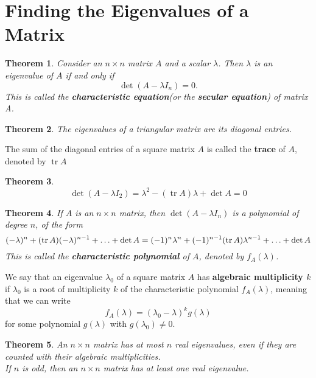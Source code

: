 \documentclass[letter]{article}
\newcommand{\tr}{\operatorname{tr}}
\newtheorem{theorem}{Theorem}[section]
\newenvironment{definition}[1][Definition]{\begin{trivlist}
\item[\hskip \labelsep {\bfseries #1}]}{\end{trivlist}}
\begin{document}
\section{Finding the Eigenvalues of a Matrix}
\begin{theorem}
Consider an $n \times n$ matrix $A$ and a scalar $\lambda$. Then $\lambda$ is an eigenvalue of $A$ if and only if
\[
\det(A-\lambda I_n) = 0.
\]
This is called the \textbf{characteristic equation}(or the \textbf{secular equation}) of matrix A.
\end{theorem}

\begin{theorem}
The eigenvalues of a triangular matrix are its diagonal entries.
\end{theorem}

\begin{definition}
The sum of the diagonal entries of a square matrix $A$ is called the \textbf{trace} of $A$, denoted by $\tr A$
\end{definition}

\begin{theorem}
\[
\det(A - \lambda I_2) = \lambda^2 - (\tr A)\lambda + \det A = 0
\]
\end{theorem}

\begin{theorem}
If $A$ is an $n \times n$ matrix, then $\det(A-\lambda I_n)$ is a polynomial of degree $n$, of the form
\[
(-\lambda)^n + (\tr A)(-\lambda)^{n-1} + \ldots + \det A\\
= (-1)^n\lambda^n + (-1)^{n-1}(\tr A)\lambda^{n-1} + \ldots + \det A
\]
This is called the \textbf{characteristic polynomial} of $A$, denoted by $f_A(\lambda)$.
\end{theorem}

\begin{definition}
We say that an eigenvalue $\lambda_0$ of a square matrix $A$ has \textbf{algebraic multiplicity $k$} if $\lambda_0$ is a root of multiplicity $k$ of the characteristic polynomial $f_A(\lambda)$, meaning that we can write
\[
f_A(\lambda) = (\lambda_0 - \lambda)^k g(\lambda)
\]
for some polynomial $g(\lambda)$ with $g(\lambda_0)\neq 0$.
\end{definition}

\begin{theorem}
An $n\times n$ matrix has at most $n$ real eigenvalues, even if they are counted with their algebraic multiplicities.\\
If $n$ is odd, then an $n \times n$ matrix has at least one real eigenvalue. 
\end{theorem}
\end{document}
